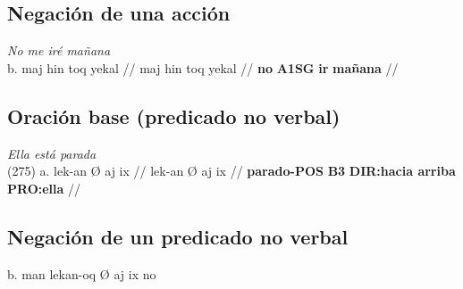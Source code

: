 \documentclass{article}%
\begin{document}
\subsection{Negación de una acción}%
\label{subsec:Negacindeunaaccin}%

%
\par\medskip%
\ex
\textit{No me iré mañana} \\
\begingl
\gla b. maj hin toq yekal //
\glb maj hin toq yekal //
\glc \textbf{no} \textbf{A1SG} \textbf{ir} \textbf{mañana} //
\endgl
\xe
%
\medskip%
\subsection{Oración base (predicado no verbal)}%
\label{subsec:Oracinbase(predicadonoverbal)}%

%
\par\medskip%
\ex
\textit{Ella está parada} \\
\begingl
\gla (275) a. lek-an Ø aj ix //
\glb lek-an Ø aj ix //
\glc \textbf{parado-}\textbf{POS} \textbf{B3} \textbf{DIR:hacia arriba} \textbf{PRO:ella} //
\endgl
\xe
%
\medskip%
\subsection{Negación de un predicado no verbal}%
\label{subsec:Negacindeunpredicadonoverbal}%

%
b. man lekan{-}oq Ø aj ix %
no 

%
\end{document}
